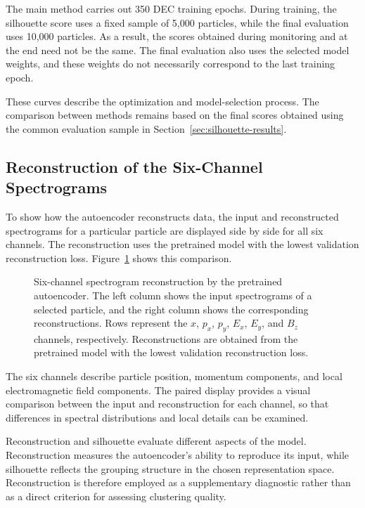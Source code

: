 The main method carries out 350 DEC training epochs. During training, the silhouette score uses a fixed sample of 5,000 particles, while the final evaluation uses 10,000 particles. As a result, the scores obtained during monitoring and at the end need not be the same. The final evaluation also uses the selected model weights, and these weights do not necessarily correspond to the last training epoch.

These curves describe the optimization and model-selection process. The comparison between methods remains based on the final scores obtained using the common evaluation sample in Section~\ref{sec:silhouette-results}.

\FloatBarrier
\subsection{Reconstruction of the Six-Channel Spectrograms}

To show how the autoencoder reconstructs data, the input and reconstructed spectrograms for a particular particle are displayed side by side for all six channels. The reconstruction uses the pretrained model with the lowest validation reconstruction loss. Figure~\ref{fig:reconstruction} shows this comparison.

\begin{figure}[htbp]
\centering
{}
\caption[Six-channel spectrogram reconstruction]{Six-channel spectrogram reconstruction by the pretrained autoencoder. The left column shows the input spectrograms of a selected particle, and the right column shows the corresponding reconstructions. Rows represent the \(x\), \(p_x\), \(p_y\), \(E_x\), \(E_y\), and \(B_z\) channels, respectively. Reconstructions are obtained from the pretrained model with the lowest validation reconstruction loss.}\label{fig:reconstruction}
\end{figure}

The six channels describe particle position, momentum components, and local electromagnetic field components. The paired display provides a visual comparison between the input and reconstruction for each channel, so that differences in spectral distributions and local details can be examined.

Reconstruction and silhouette evaluate different aspects of the model. Reconstruction measures the autoencoder's ability to reproduce its input, while silhouette reflects the grouping structure in the chosen representation space. Reconstruction is therefore employed as a supplementary diagnostic rather than as a direct criterion for assessing clustering quality.

